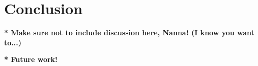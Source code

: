 \section{Conclusion}


\noindent\textbf{* Make sure not to include discussion here, Nanna! (I know you want to...)}

\noindent\textbf{* Future work!}